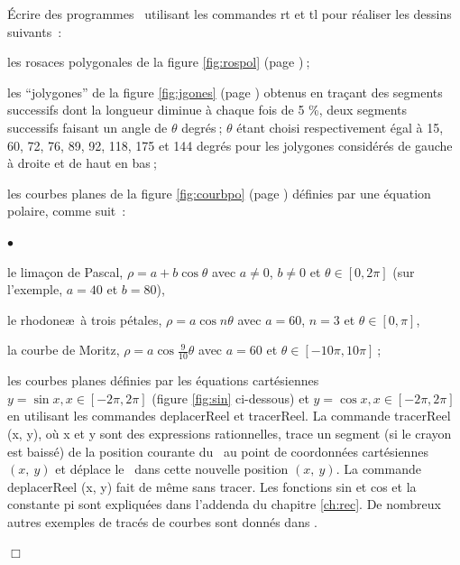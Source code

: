 \begin{exercices}{Écrire des programmes \ocaml\  utilisant les commandes {\idt rt}
et {\idt tl} pour réaliser les dessins suivants~:

\tiret les rosaces polygonales de la figure \ref{fig:rospol} (page \pageref{fig:rospol})$\:$;

\tiret les ``jolygones'' de la figure \ref{fig:jgones} (page \pageref{fig:jgones}) obtenus en traçant des
segments successifs dont la longueur diminue à chaque fois de 5 \%, deux segments successifs faisant
un angle de $\theta$ degrés$\:$; $\theta$ étant choisi respectivement égal à 15, 60, 72, 76, 89, 92,
118, 175 et 144 degrés
pour les jolygones 
considérés de gauche
à droite et de haut en bas$\:$;

\tiret les courbes planes de la figure \ref{fig:courbpo} (page \pageref{fig:courbpo})
définies par une équation polaire, comme suit~:
 \begin{list}{$\scriptscriptstyle\bullet$}{
}
   \item le limaçon de Pascal, $\rho = a + b \cos{\theta}$ avec
   $a \neq 0$, $b \neq 0$ et $\theta \in [0, 2\pi]$ (sur l'exemple, $a = 40$ et $b = 80$),
   \item le rhodone\ae\ à trois pétales, $\rho = a \cos{n \theta}$ avec 
    $a = 60$, $n = 3$ et $\theta \in [0, \pi]$,
   \item la courbe de Moritz, $\rho = a \cos{\frac{9}{10} \theta}$ avec 
    $a = 60$ et $\theta \in [-10 \pi, 10 \pi]$$\:$;
   \end{list}

\tiret les courbes planes définies par les équations cartésiennes $y = \sin{x}, x \in [-2\pi, 2\pi]$
  (figure \ref{fig:sin} ci-dessous) et  $y = \cos{x}, x \in [-2\pi, 2\pi]$ en utilisant les commandes {\idt deplacerReel} 
  et {\idt tracerReel}. La commande {\idt tracerReel (x, y)},
  où {\idt x} et {\idt y} sont des expressions rationnelles,
  trace un segment (si le crayon est baissé) de la position courante du
  \robot\ au point de coordonnées cartésiennes $(x,\ y)$ et déplace le \robot\ dans
  cette nouvelle position  $(x,\ y)$. La commande {\idt deplacerReel (x, y)} fait de
  même sans tracer. Les fonctions {\idt sin} et {\idt cos} et la constante {\idt pi}
  sont expliquées dans l'addenda du chapitre \ref{ch:rec}.
   De nombreux autres exemples de tracés de courbes sont donnés dans \cite{LT}.

\noindent $\Box$}\end{exercices}
